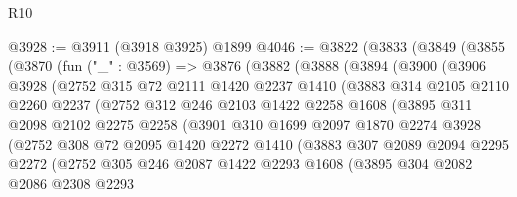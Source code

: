 \begin{lexlean}{R10}
\begin{coremodule}
@3928 := @3911 (@3918 @3925) @1899
@4046 := @3822
    (@3833
      (@3849
        (@3855
          (@3870
            (fun ("_" : @3569) =>
            @3876
              (@3882
                (@3888
                  (@3894
                    (@3900
                      (@3906
                        @3928
                        (@2752
                          @315
                          @72
                          @2111
                          @1420
                          @2237
                          @1410
                          (@3883
                            @314
                            @2105
                            @2110
                            @2260
                            @2237
                            (@2752
                              @312
                              @246
                              @2103
                              @1422
                              @2258
                              @1608
                              (@3895
                                @311
                                @2098
                                @2102
                                @2275
                                @2258
                                (@3901
                                  @310
                                  @1699
                                  @2097
                                  @1870
                                  @2274
                                  @3928
                                  (@2752
                                    @308
                                    @72
                                    @2095
                                    @1420
                                    @2272
                                    @1410
                                    (@3883
                                      @307
                                      @2089
                                      @2094
                                      @2295
                                      @2272
                                      (@2752
                                        @305
                                        @246
                                        @2087
                                        @1422
                                        @2293
                                        @1608
                                        (@3895
                                          @304
                                          @2082
                                          @2086
                                          @2308
                                          @2293

\end{coremodule}
\end{lexlean}

